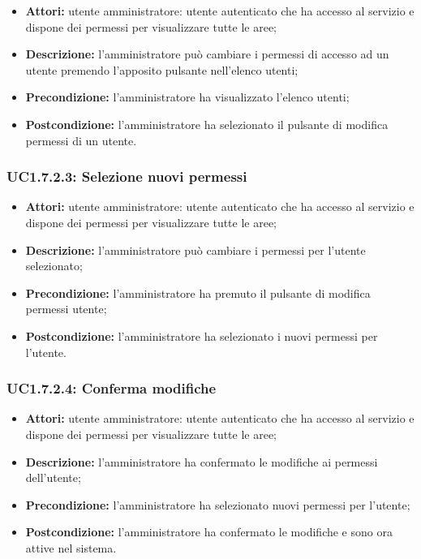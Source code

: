 \begin{itemize}
    \item \textbf{Attori:} utente amministratore: utente autenticato che ha accesso al servizio e dispone dei permessi per visualizzare tutte le aree;
    \item \textbf{Descrizione:} l'amministratore può cambiare i permessi di accesso ad un utente premendo l'apposito pulsante nell'elenco utenti;
    \item \textbf{Precondizione:} l'amministratore ha visualizzato l'elenco utenti;
    \item \textbf{Postcondizione:} l'amministratore ha selezionato il pulsante di modifica permessi di un utente.
\end{itemize}

\subsubsection{UC1.7.2.3: Selezione nuovi permessi}

\begin{itemize}
    \item \textbf{Attori:} utente amministratore: utente autenticato che ha accesso al servizio e dispone dei permessi per visualizzare tutte le aree;
    \item \textbf{Descrizione:} l'amministratore può cambiare i permessi per l'utente selezionato;
    \item \textbf{Precondizione:} l'amministratore ha premuto il pulsante di modifica permessi utente;
    \item \textbf{Postcondizione:} l'amministratore ha selezionato i nuovi permessi per l'utente.
\end{itemize}

\subsubsection{UC1.7.2.4: Conferma modifiche}

\begin{itemize}
    \item \textbf{Attori:} utente amministratore: utente autenticato che ha accesso al servizio e dispone dei permessi per visualizzare tutte le aree;
    \item \textbf{Descrizione:} l'amministratore ha confermato le modifiche ai permessi dell'utente;
    \item \textbf{Precondizione:} l'amministratore ha selezionato nuovi permessi per l'utente;
    \item \textbf{Postcondizione:} l'amministratore ha confermato le modifiche e sono ora attive nel sistema.
\end{itemize}

